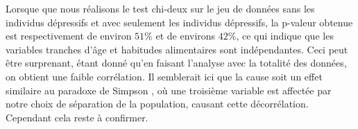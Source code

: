 Lorsque que nous réalisons le test chi-deux sur le jeu de données sans les individus dépressifs et avec seulement les individus dépressifs, la p-valeur obtenue est respectivement de environ $51\%$ et de environs $42\%$, ce qui indique que les variables tranches d'âge et habitudes alimentaires sont indépendantes. 
Ceci peut être surprenant, étant donné qu'en faisant l'analyse avec la totalité des données, on obtient une faible corrélation. Il semblerait ici que la cause soit un effet similaire au paradoxe de Simpson \citep{simpson}, où une troisième variable est affectée par notre choix de séparation de la population, causant cette décorrélation. Cependant cela reste à confirmer.
